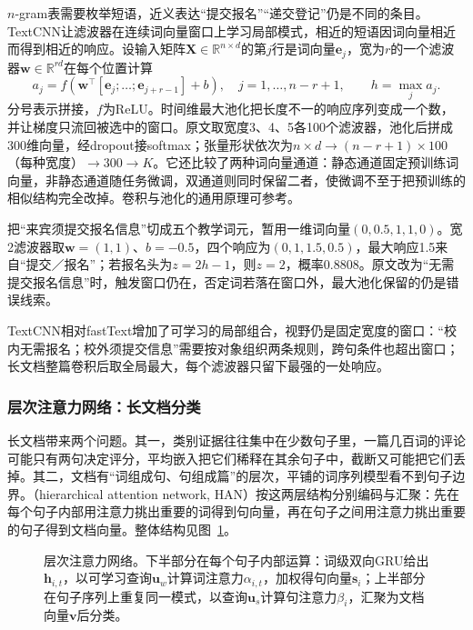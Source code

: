 $n$-gram表需要枚举短语，近义表达“提交报名”“递交登记”仍是不同的条目。TextCNN让滤波器在连续词向量窗口上学习局部模式，相近的短语因词向量相近而得到相近的响应。设输入矩阵$\bm X\in\mathbb R^{n\times d}$的第$j$行是词向量$\bm e_j$，宽为$r$的一个滤波器$\bm w\in\mathbb R^{rd}$在每个位置计算
\[
  a_j=f\!\left(\bm w^\top
  [\bm e_j;\ldots;\bm e_{j+r-1}]+b\right),\quad j=1,\ldots,n-r+1,\qquad
  h=\max_j a_j.
\]
分号表示拼接，$f$为ReLU。时间维最大池化把长度不一的响应序列变成一个数，并让梯度只流回被选中的窗口。原文取宽度3、4、5各100个滤波器，池化后拼成300维向量，经dropout接softmax；张量形状依次为$n\times d\to(n-r+1)\times100$（每种宽度）$\to300\to K$。它还比较了两种词向量通道：静态通道固定预训练词向量，非静态通道随任务微调，双通道则同时保留二者，使微调不至于把预训练的相似结构完全改掉。卷积与池化的通用原理可参考。

把“来宾须提交报名信息”切成五个教学词元，暂用一维词向量$(0,0.5,1,1,0)$。宽2滤波器取$\bm w=(1,1)$、$b=-0.5$，四个响应为$(0,1,1.5,0.5)$，最大响应1.5来自“提交／报名”；若报名头为$z=2h-1$，则$z=2$，概率0.8808。原文改为“无需提交报名信息”时，触发窗口仍在，否定词若落在窗口外，最大池化保留的仍是错误线索。

TextCNN相对fastText增加了可学习的局部组合，视野仍是固定宽度的窗口：“校内无需报名；校外须提交信息”需要按对象组织两条规则，跨句条件也超出窗口；长文档整篇卷积后取全局最大，每个滤波器只留下最强的一处响应。

\subsubsection{层次注意力网络：长文档分类}
\label{sec:nlp-classification-han}

长文档带来两个问题。其一，类别证据往往集中在少数句子里，一篇几百词的评论可能只有两句决定评分，平均嵌入把它们稀释在其余句子中，截断又可能把它们丢掉。其二，文档有“词组成句、句组成篇”的层次，平铺的词序列模型看不到句子边界。（hierarchical attention network, HAN）按这两层结构分别编码与汇聚：先在每个句子内部用注意力挑出重要的词得到句向量，再在句子之间用注意力挑出重要的句子得到文档向量。整体结构见图~\ref{fig:nlp-classification-han}。

\begin{figure}[tbp]
  \centering
  
  \caption{层次注意力网络。下半部分在每个句子内部运算：词级双向GRU给出$\bm h_{i,t}$，以可学习查询$\bm u_w$计算词注意力$\alpha_{i,t}$，加权得句向量$\bm s_i$；上半部分在句子序列上重复同一模式，以查询$\bm u_s$计算句注意力$\beta_i$，汇聚为文档向量$\bm v$后分类。}
  \label{fig:nlp-classification-han}
\end{figure}

